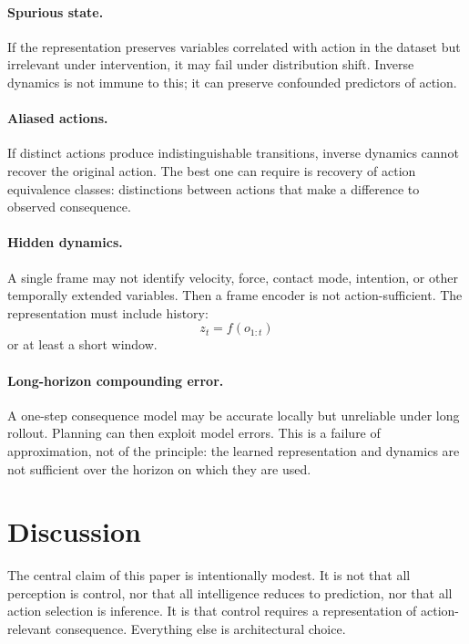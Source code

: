 \documentclass[11pt]{article}
\theoremstyle{remark}
\newcommand{\1}{\mathbb 1}
\begin{document}
\paragraph{Spurious state.}
If the representation preserves variables correlated with action in the dataset but irrelevant under intervention, it may fail under distribution shift. Inverse dynamics is not immune to this; it can preserve confounded predictors of action.

\paragraph{Aliased actions.}
If distinct actions produce indistinguishable transitions, inverse dynamics cannot recover the original action. The best one can require is recovery of action equivalence classes: distinctions between actions that make a difference to observed consequence.

\paragraph{Hidden dynamics.}
A single frame may not identify velocity, force, contact mode, intention, or other temporally extended variables. Then a frame encoder is not action-sufficient. The representation must include history:
\begin{equation}
    z_t=f(o_{1:t})
\end{equation}
or at least a short window.

\paragraph{Long-horizon compounding error.}
A one-step consequence model may be accurate locally but unreliable under long rollout. Planning can then exploit model errors. This is a failure of approximation, not of the principle: the learned representation and dynamics are not sufficient over the horizon on which they are used.

\section{Discussion}

The central claim of this paper is intentionally modest. It is not that all perception is control, nor that all intelligence reduces to prediction, nor that all action selection is inference. It is that control requires a representation of action-relevant consequence. Everything else is architectural choice.
\end{document}
